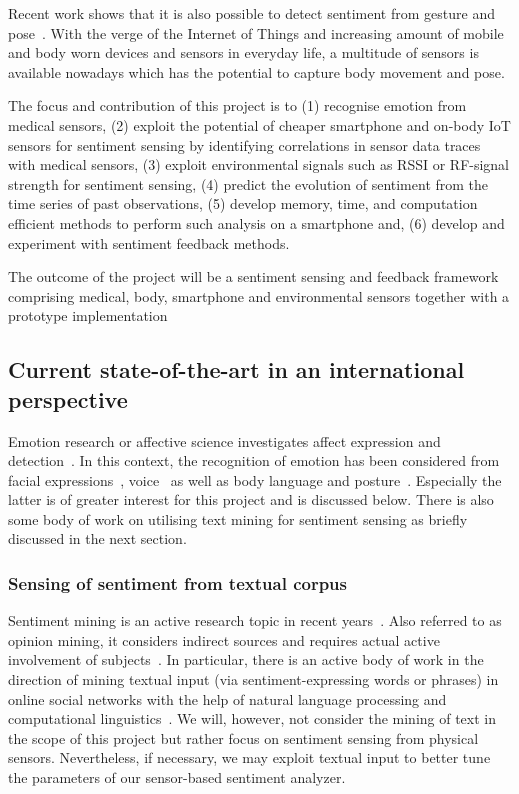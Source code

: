\documentclass[12pt]{article}
\begin{document}
Recent work shows that it is also possible to detect sentiment from gesture and pose~\cite{Emotion_DeMeijer_1989}. 
With the verge of the Internet of Things and increasing amount of mobile and body worn devices and sensors in everyday life, a multitude of sensors is available nowadays which has the potential to capture body movement and pose. 

The focus and contribution of this project is to (1) recognise emotion from medical sensors, (2) exploit the potential of cheaper smartphone and on-body IoT sensors for sentiment sensing by identifying correlations in sensor data traces with medical sensors, (3) exploit environmental signals such as RSSI or RF-signal strength for sentiment sensing, (4) predict the evolution of sentiment from the time series of past observations, (5) develop memory, time, and computation efficient methods to perform such analysis on a smartphone and, (6) develop and experiment with sentiment feedback methods.

The outcome of the project will be a sentiment sensing and feedback framework comprising medical, body, smartphone and environmental sensors together with a prototype implementation

\subsection*{Current state-of-the-art in an international perspective}
Emotion research or affective science investigates affect expression and detection~\cite{SentimentSensing_Calvo_2010}.
In this context, the recognition of emotion has been considered from facial expressions~\cite{SentimentSensing_Ekman_2003}, voice~\cite{SentimentSensing_Juslin_2005} as well as body language and posture~\cite{SentimentSensing_Mota_2003,SentimentSesing_Mello_2009}.
Especially the latter is of greater interest for this project and is discussed below. 
There is also some body of work on utilising text mining for sentiment sensing as briefly discussed in the next section. 

\subsubsection*{Sensing of sentiment from textual corpus}
Sentiment mining is an active research topic in recent years~\cite{SentimentSensing_Kramer_2014, SentimentSensing_Cambria_2013}. 
Also referred to as opinion mining, it considers indirect sources and requires actual active involvement of subjects~\cite{SentimentSensing_Pang_2008, SentimentSensing_Zhai_2011}. 
In particular, there is an active body of work in the direction of mining textual input (via sentiment-expressing words or phrases) in online social networks with the help of natural language processing and computational linguistics~\cite{SentimentSensing_Liu_2012}.
We will, however, not consider the mining of text in the scope of this project but rather focus on sentiment sensing from physical sensors. Nevertheless, if necessary, we may exploit textual input to better tune the parameters of our sensor-based sentiment analyzer. 
\end{document}
